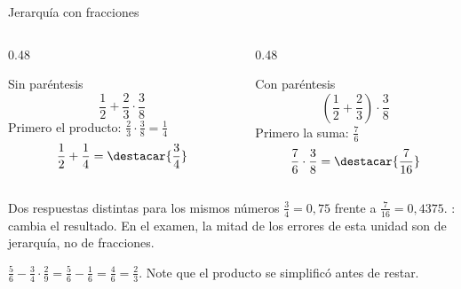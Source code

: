 \documentclass[aspectratio=169,10pt]{beamer}
\begin{document}
\begin{frame}{Jerarquía con fracciones}
  \scriptsize
  \begin{columns}[T,onlytextwidth]
    \begin{column}{0.48\textwidth}
      \begin{exampleblock}{Sin paréntesis}
        \tiny
        \[ \frac{1}{2}+\frac{2}{3}\cdot\frac{3}{8} \]
        Primero el producto:
        $\tfrac{2}{3}\cdot\tfrac{3}{8}=\tfrac{1}{4}$
        \[ \frac{1}{2}+\frac{1}{4} = \destacar{\frac{3}{4}} \]
      \end{exampleblock}
    \end{column}
    \begin{column}{0.48\textwidth}
      \begin{exampleblock}{Con paréntesis}
        \tiny
        \[ \left(\frac{1}{2}+\frac{2}{3}\right)\cdot\frac{3}{8} \]
        Primero la suma: $\tfrac{7}{6}$
        \[ \frac{7}{6}\cdot\frac{3}{8} = \destacar{\frac{7}{16}} \]
      \end{exampleblock}
    \end{column}
  \end{columns}

  \vspace{0.12cm}
  \begin{alertblock}{Dos respuestas distintas para los mismos números}
    \tiny
    $\tfrac{3}{4} = 0{,}75$ frente a $\tfrac{7}{16} = 0{,}4375$.
    : cambia el resultado. En el
    examen, la mitad de los errores de esta unidad son de jerarquía, no de
    fracciones.
  \end{alertblock}

  \vspace{0.06cm}
  {\tiny\color{uniGris} 
  $\tfrac{5}{6}-\tfrac{3}{4}\cdot\tfrac{2}{9}
  = \tfrac{5}{6}-\tfrac{1}{6} = \tfrac{4}{6} = \tfrac{2}{3}$. Note que el
  producto se simplificó antes de restar.}
\end{frame}
\end{document}
